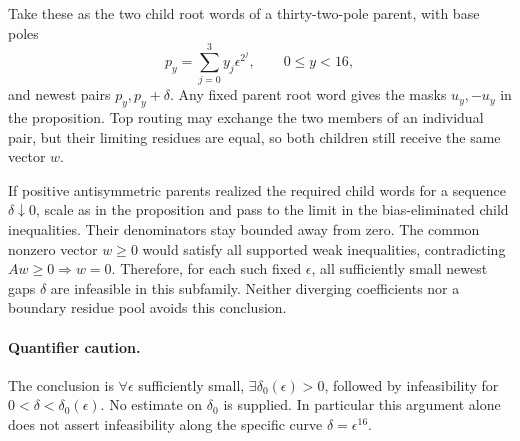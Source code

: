 \documentclass[11pt]{article}
\begin{document}
Take these as the two child root words of a thirty-two-pole parent,
with base poles
\[
 p_y=\sum_{j=0}^3 y_j\epsilon^{2^j},\qquad 0\leq y<16,
\]
and newest pairs $p_y,p_y+\delta$. Any fixed parent root word gives
the masks $u_y,-u_y$ in the proposition. Top routing may exchange the
two members of an individual pair, but their limiting residues are
equal, so both children still receive the same vector $w$.

If positive antisymmetric parents realized the required child words
for a sequence $\delta\downarrow0$, scale as in the proposition and
pass to the limit in the bias-eliminated child inequalities. Their
denominators stay bounded away from zero. The common nonzero vector
$w\geq0$ would satisfy all supported weak inequalities, contradicting
$Aw\geq0\Rightarrow w=0$. Therefore, for each such fixed $\epsilon$,
all sufficiently small newest gaps $\delta$ are infeasible in this
subfamily. Neither diverging coefficients nor a boundary residue pool
avoids this conclusion.

\paragraph{Quantifier caution.}
The conclusion is $\forall\epsilon$ sufficiently small,
$\exists\delta_0(\epsilon)>0$, followed by infeasibility for
$0<\delta<\delta_0(\epsilon)$. No estimate on $\delta_0$ is supplied.
In particular this argument alone does not assert infeasibility along
the specific curve $\delta=\epsilon^{16}$.
\end{document}
